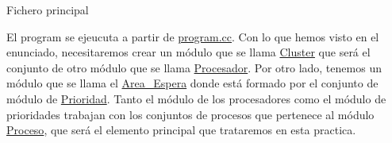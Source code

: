 Fichero principal

El program se ejeucuta a partir de \mbox{\hyperlink{program_8cc}{program.\+cc}}. Con lo que hemos visto en el enunciado, necesitaremos crear un módulo que se llama \mbox{\hyperlink{classCluster}{Cluster}} que será el conjunto de otro módulo que se llama \mbox{\hyperlink{classProcesador}{Procesador}}. Por otro lado, tenemos un módulo que se llama el \mbox{\hyperlink{classArea__Espera}{Area\+\_\+\+Espera}} donde está formado por el conjunto de módulo de \mbox{\hyperlink{classPrioridad}{Prioridad}}. Tanto el módulo de los procesadores como el módulo de prioridades trabajan con los conjuntos de procesos que pertenece al módulo \mbox{\hyperlink{classProceso}{Proceso}}, que será el elemento principal que trataremos en esta practica. 